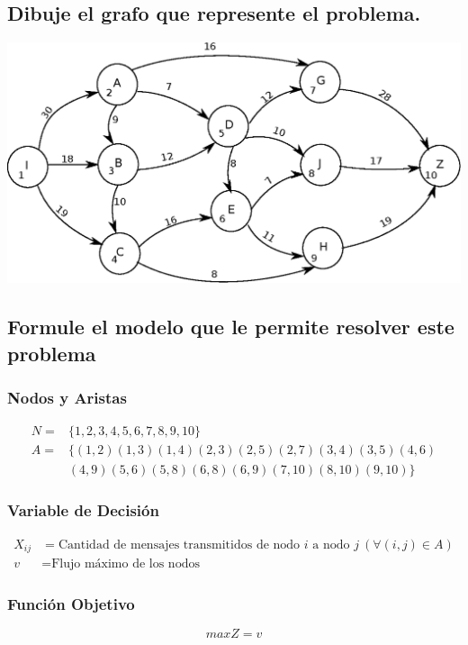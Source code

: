 \documentclass[a4paper,12pt]{article}
\begin{document}
\subsection{Dibuje el grafo que represente el problema.}
\includegraphics[scale=1]{drawing.eps}
\subsection{Formule el modelo que le permite resolver este problema}
\subsubsection{Nodos y Aristas}
\begin{equation*}
\begin{split}
	N = &\{1,2,3,4,5,6,7,8,9,10\} \\
	A = &\{ (1,2)(1,3)(1,4)(2,3)(2,5)(2,7)(3,4)(3,5)(4,6)\\
	  &(4,9)(5,6)(5,8)(6,8)(6,9)(7,10)(8,10)(9,10) \}
\end{split}
\end{equation*}
\subsubsection{Variable de Decisión}
\begin{equation*}
\begin{split}
	X_{ij} &= \text{Cantidad de mensajes transmitidos de nodo } i \text{ a nodo } j \ (\forall(i,j)\in A)\\
	v &= \text{Flujo máximo de los nodos}
\end{split}
\end{equation*}

\subsubsection{Función Objetivo}
\begin{equation*}
	maxZ = v
\end{equation*}
\end{document}
